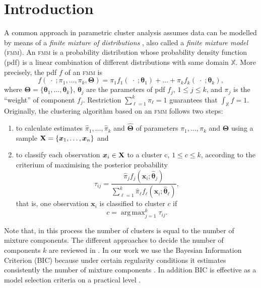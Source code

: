 \documentclass[submit]{smj}
\DeclareMathOperator*{\argmax}{arg\,max}
\theoremstyle{definition}
\newcommand{\m}[1]{\boldsymbol{#1}}
\newcommand{\fmm}{\textsc{fmm}\xspace}
\newcommand{\X}{\text{\textbf{X}}}
\begin{document}



\maketitle

\section{Introduction}


A common approach in parametric cluster analysis assumes data can be modelled by means of a \emph{finite mixture of distributions} \citep{fraley2002model, punzo2014flexible}, also called a \emph{finite mixture model} (\fmm). An \fmm is a probability distribution whose probability density function (pdf) is a linear combination of different distributions with same domain $\mathbb{X}$. More precisely, the pdf $f$ of an \fmm is
\begin{equation}\label{mixt}
f(\;\cdot\; ; \pi_1, \dots, \pi_k, \m\Theta) = \pi_1 f_1(\;\cdot\; ; \m\theta_1) + \dots + \pi_k f_k(\;\cdot\; ; \m\theta_k),
\end{equation}
where $\m\Theta =\{ \m\theta_1, \dots, \m\theta_k\}$, $\m\theta_j$ are the parameters of pdf $f_j$, $1\leq j \leq k$, and $\pi_j$ is the ``weight'' of component $f_j$. Restriction $\sum_{\ell = 1}^k \pi_\ell = 1$ guarantees that  $\int_{\mathbb{X}}f = 1$. Originally, the clustering algorithm based on an \fmm follows two steps:
\begin{enumerate}
\item to calculate estimates $\hat{\pi}_1, \dots, \hat{\pi}_k$ and $\hat{\m\Theta}$ of parameters $\pi_1, \dots, \pi_k$ and $\m\Theta$ using a sample $\X=\{\m x_1, \dots, \m x_n\}$ and
\item to classify each observation $\m x_i \in \X$ to a cluster c, $1\leq c \leq k$, according to the criterium of maximising the posterior probability
\[
\tau_{ij}= \frac{ \hat{\pi}_j f_j(\m x_i ; \hat{\m\theta}_j) }{\sum_{\ell=1}^k \hat{\pi}_\ell f_\ell(\m x_i ; \hat{\m\theta}_\ell) },
\]
that is, one observation $\m x_i$ is classified to cluster $c$ if
\begin{equation}\label{map_criteria}
c = \argmax_{j=1}^k \tau_{ij}.
\end{equation}
\end{enumerate}
Note that, in this process the number of clusters is equal to the number of mixture components. The different approaches to decide the number of components $k$ are reviewed in \cite{mclachlan2014components}. In our work we use the Bayesian Information Criterion (BIC) because under certain regularity conditions it estimates consistently the number of mixture components \citep{keribin1998consistent, keribin2000consistent}. In addition BIC is effective as a model selection criteria on a practical level \citep{fraley1998how}.
\end{document}
